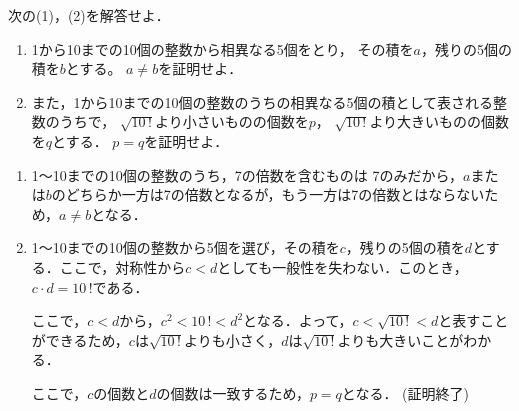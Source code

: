\begin{problem}
  次の(1)，(2)を解答せよ．
\begin{enumerate}
\item 1から10までの10個の整数から相異なる5個をとり，
その積を$a$，残りの5個の積を$b$とする。
$a \neq b$を証明せよ．
\item また，1から10までの10個の整数のうちの相異なる5個の積として表される整数のうちで，
$\sqrt{10 \, !}$より小さいものの個数を$p$，
$\sqrt{10 \, !}$より大きいものの個数を$q$とする．
$p=q$を証明せよ．
\end{enumerate}
\end{problem}

\begin{enumerate}
  \item 1～10までの10個の整数のうち，7の倍数を含むものは
  7のみだから，$a$または$b$のどちらか一方は7の倍数となるが，もう一方は7の倍数とはならないため，$a \neq b$となる．

  \item 1～10までの10個の整数から5個を選び，その積を$c$，残りの5個の積を$d$とする．ここで，対称性から$c < d$としても一般性を失わない．このとき，$c\cdot d = 10\,!$である．

  ここで，$c < d$から，$c^2 < 10\,! < d^2$となる．よって，$c < \sqrt{10\,!} < d$と表すことができるため，$c$は$\sqrt{10\,!}$よりも小さく，$d$は$\sqrt{10\,!}$よりも大きいことがわかる．

  ここで，$c$の個数と$d$の個数は一致するため，$p = q$となる．
  \hfill
  (証明終了)
\end{enumerate}
